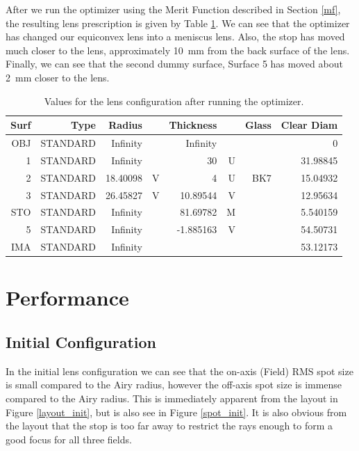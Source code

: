 \documentclass[10pt,a4paper]{article}
\begin{document}
		After we run the optimizer using the Merit Function described in Section \ref{mf}, the resulting lens prescription is given by Table \ref{opti_v}. We can see that the optimizer has changed our equiconvex lens into a meniscus lens. Also, the stop has moved much closer to the lens, approximately \SI{10}{\milli \meter} from the back surface of the lens. Finally, we can see that the second dummy surface, Surface 5 has moved about \SI{2}{\milli \meter} closer to the lens. 
	
		\begin{table}[H]
			\centering
			\begin{tabular}{r| r r r r r r r }
				Surf&       	Type&        	Radius&&        	Thickness&&           	Glass&      	  Clear Diam \\ \hline
				OBJ&	 STANDARD&	       Infinity&&	       Infinity&&&                     	             0 \\
				1&	 STANDARD&	       Infinity&&	             30	  &U&&                   	      31.98845 \\
				2&	 STANDARD&	       18.40098&V&	              4	  &U &              BK7&	      15.04932 \\
				3&	 STANDARD&	       26.45827&V&	       10.89544	 &V& &                   	      12.95634 \\
				STO&	 STANDARD&	       Infinity	&&       81.69782&M&	&                     	      5.540159 \\
				5&	 STANDARD	&       Infinity&&	      -1.885163	 &V& &                   	      54.50731 \\
				IMA&	 STANDARD&	       Infinity	&&&   &            	  &                   	      53.12173 \\
			\end{tabular}
			\caption{Values for the lens configuration after running the optimizer.}
			\label{opti_v}
		\end{table}
		
		\pagebreak
	
\section{Performance}

	\subsection{Initial Configuration}
	
		In the initial lens configuration we can see that the on-axis (Field) RMS spot size is small compared to the Airy radius, however the off-axis spot size is immense compared to the Airy radius. This is immediately apparent from the layout in Figure \ref{layout_init}, but is also see in Figure \ref{spot_init}. It is also obvious from the layout that the stop is too far away to restrict the rays enough to form a good focus for all three fields.
	
\end{document}
